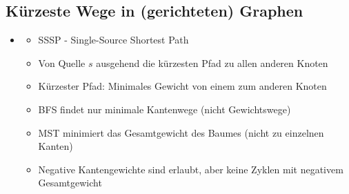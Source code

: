 \documentclass[
    12pt,
    a4paper,
    ngerman,
    color=3b,%
    marginpar=false,
    colorback=false,
    leqno,
]{tudaexercise}
\begin{document}
\subsection{Kürzeste Wege in (gerichteten) Graphen}
    \begin{itemize}
        \item {}
            \begin{itemize}
                \item SSSP - Single-Source Shortest Path
                \item Von Quelle $s$ ausgehend die kürzesten Pfad zu allen anderen Knoten
                \item Kürzester Pfad: Minimales Gewicht von einem zum anderen Knoten
                \item BFS findet nur minimale Kantenwege (nicht Gewichtswege)
                \item MST minimiert das Gesamtgewicht des Baumes (nicht zu einzelnen Kanten)
                \item Negative Kantengewichte sind erlaubt, aber keine Zyklen mit negativem Gesamtgewicht
            \end{itemize}
        

\end{itemize}
\end{document}
